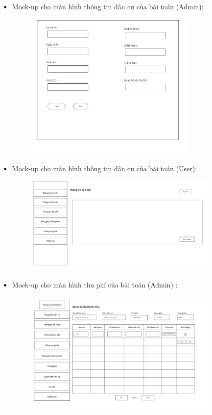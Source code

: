 \documentclass{article}
\begin{document}
\begin{itemize}
    \item Mock-up cho màn hình thông tin dân cư của bài toán (Admin):
    \begin{figure}[H]
        \centering
        \includegraphics[width=0.8\textwidth]{Ảnh chương 4/Màn hình thông tin cư dân (admin).png}
    \end{figure}
    \item Mock-up cho màn hình thông tin dân cư của bài toán (User):
    \begin{figure}[H]
        \centering
        \includegraphics[width=0.9\textwidth]{Ảnh chương 4/Màn hình thông tin cư dân.png}
    \end{figure}
    \item Mock-up cho màn hình thu phí của bài toán (Admin) :
    \begin{figure}[H]
        \centering
        \includegraphics[width=0.9\textwidth]{Ảnh chương 4/Màn hình thu phí.png}

\end{figure}
\end{itemize}
\end{document}
